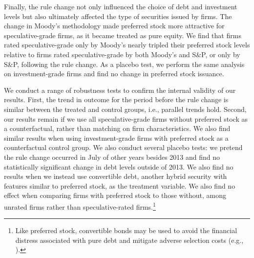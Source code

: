 \documentclass[a4paper, 12pt]{article}
\begin{document}
Finally, the rule change not only influenced the choice of debt and investment levels but also ultimately affected the type of securities issued by firms. The change in Moody's methodology made preferred stock more attractive for speculative-grade firms, as it became treated as pure equity. We find that firms rated speculative-grade only by Moody's nearly tripled their preferred stock levels relative to firms rated speculative-grade by both Moody's and S\&P, or only by S\&P, following the rule change. As a placebo test, we perform the same analysis on investment-grade firms and find no change in preferred stock issuance.

We conduct a range of robustness tests to confirm the internal validity of our results. First, the trend in outcome for the period before the rule change is similar between the treated and control groups, i.e., parallel trends hold. Second, our results remain if we use all speculative-grade firms without preferred stock as a counterfactual, rather than matching on firm characteristics. We also find similar results when using investment-grade firms with preferred stock as a counterfactual control group. We also conduct several placebo tests: we pretend the rule change occurred in July of other years besides 2013 and find no statistically significant change in debt levels outside of 2013. We also find no results when we instead use convertible debt, another hybrid security with features similar to preferred stock, as the treatment variable. We also find no effect when comparing firms with preferred stock to those without, among unrated firms rather than speculative-rated firms.\footnote{Like preferred stock, convertible bonds may be used to avoid the financial distress associated with pure debt and mitigate adverse selection costs (e.g., \citealp{stein1992convertible}).}
\end{document}
